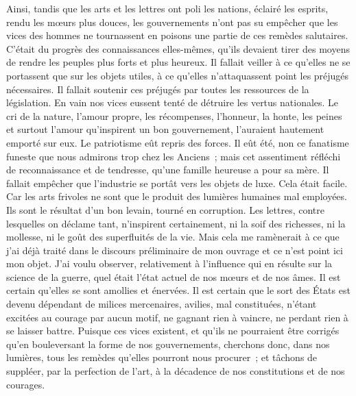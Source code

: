 \documentclass[french,twoside]{book} %
\begin{document}
Ainsi, tandis que les arts et les lettres ont poli les nations, éclairé les esprits, rendu les mœurs plus douces, les gouvernements n’ont pas su empêcher que les vices des hommes ne tournassent en poisons une partie de ces remèdes salutaires. C’était du progrès des connaissances elles-mêmes, qu’ils devaient tirer des moyens de rendre les peuples plus forts et plus heureux. Il fallait veiller à ce qu’elles ne se portassent que sur les objets utiles, à ce qu’elles n’attaquassent point les préjugés nécessaires. Il fallait soutenir ces préjugés par toutes les ressources de la législation. En vain nos vices eussent tenté de détruire les vertus nationales. Le cri de la nature, l’amour propre, les récompenses, l’honneur, la honte, les peines et surtout l’amour qu’inspirent un bon gouvernement, l’auraient hautement emporté sur eux. Le patriotisme eût repris des forces. Il eût été, non ce fanatisme funeste que nous admirons trop chez les Anciens ; mais cet assentiment réfléchi de reconnaissance et de tendresse, qu’une famille heureuse a pour sa mère. Il fallait empêcher que l’industrie se portât vers les objets de luxe. Cela était facile. Car les arts frivoles ne sont que le produit des lumières humaines mal employées. Ils sont le résultat d’un bon levain, tourné en corruption. Les lettres, contre lesquelles on déclame tant, n’inspirent certainement, ni la soif des richesses, ni la mollesse, ni le goût des superfluités de la vie. Mais cela me ramènerait à ce que j’ai déjà traité dans le discours préliminaire de mon ouvrage et ce n’est point ici mon objet. J’ai voulu observer, relativement à l’influence qui en résulte sur la science de la guerre, quel était l’état actuel de nos mœurs et de nos âmes. Il est certain qu’elles se sont amollies et énervées. Il est certain que le sort des États est devenu dépendant de milices mercenaires, avilies, mal constituées, n’étant excitées au courage par aucun motif, ne gagnant rien à vaincre, ne perdant rien à se laisser battre. Puisque ces vices existent, et qu’ils ne pourraient être corrigés qu’en bouleversant la forme de nos gouvernements, cherchons donc, dans nos lumières, tous les remèdes qu’elles pourront nous procurer ; et tâchons de suppléer, par la perfection de l’art, à la décadence de nos constitutions et de nos courages.
\end{document}
